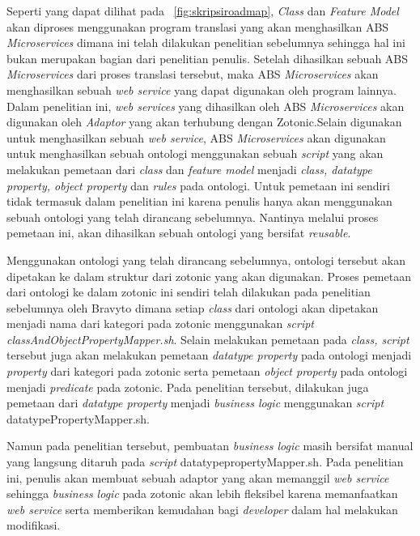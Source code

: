 Seperti yang dapat dilihat pada \pic~\ref{fig:skripsiroadmap}, \textit{Class} dan \textit{Feature Model} akan diproses menggunakan program translasi yang akan menghasilkan ABS \textit{Microservices} dimana ini telah dilakukan penelitian sebelumnya sehingga hal ini bukan merupakan bagian dari penelitian penulis. Setelah dihasilkan sebuah ABS \textit{Microservices} dari proses translasi tersebut, maka ABS \textit{Microservices} akan menghasilkan sebuah \textit{web service} yang dapat digunakan oleh program lainnya. Dalam penelitian ini, \textit{web services} yang dihasilkan oleh ABS \textit{Microservices} akan digunakan oleh \textit{Adaptor} yang akan terhubung dengan Zotonic.Selain digunakan untuk menghasilkan sebuah \textit{web service}, ABS \textit{Microservices} akan digunakan untuk menghasilkan sebuah ontologi menggunakan sebuah \textit{script} yang akan melakukan pemetaan dari \textit{class} dan \textit{feature model} menjadi \textit{class, datatype property, object property} dan \textit{rules} pada ontologi. Untuk pemetaan ini sendiri tidak termasuk dalam penelitian ini karena penulis hanya akan menggunakan sebuah ontologi yang telah dirancang sebelumnya. Nantinya melalui proses pemetaan ini, akan dihasilkan sebuah ontologi yang bersifat \textit{reusable}.

Menggunakan ontologi yang telah dirancang sebelumnya, ontologi tersebut akan dipetakan ke dalam struktur dari zotonic yang akan digunakan. Proses pemetaan dari ontologi ke dalam zotonic ini sendiri telah dilakukan pada penelitian sebelumnya oleh Bravyto dimana setiap \textit{class} dari ontologi akan dipetakan menjadi nama dari kategori pada zotonic menggunakan \textit{script classAndObjectPropertyMapper.sh}. Selain melakukan pemetaan pada \textit{class, script} tersebut juga akan melakukan pemetaan \textit{datatype property} pada ontologi menjadi \textit{property} dari kategori pada zotonic serta pemetaan \textit{object property} pada ontologi menjadi \textit{predicate} pada zotonic. Pada penelitian tersebut, dilakukan juga pemetaan dari \textit{datatype property} menjadi \textit{business logic} menggunakan \textit{script} datatypePropertyMapper.sh.

Namun pada penelitian tersebut, pembuatan \textit{business logic} masih bersifat manual yang langsung ditaruh pada \textit{script} datatypepropertyMapper.sh. Pada penelitian ini, penulis akan membuat sebuah adaptor yang akan memanggil \textit{web service} sehingga \textit{business logic} pada zotonic akan lebih fleksibel karena memanfaatkan \textit{web service} serta memberikan kemudahan bagi \textit{developer} dalam hal melakukan modifikasi.
